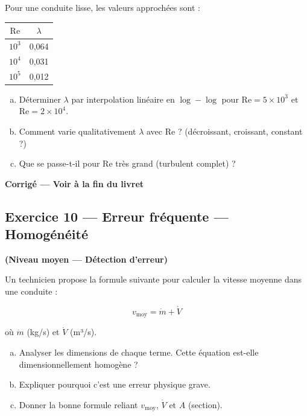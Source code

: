 Pour une conduite lisse, les valeurs approchées sont :

\begin{center}
  \sffamily\small
  \begin{tabular}{|c|c|}
    \hline
    $\mathrm{Re}$ & $\lambda$ \\
    \hline
    $10^3$ & 0{,}064 \\
    $10^4$ & 0{,}031 \\
    $10^5$ & 0{,}012 \\
    \hline
  \end{tabular}
\end{center}

\begin{enumerate}[a)]
  \item Déterminer $\lambda$ par interpolation linéaire en $\log-\log$ pour $\mathrm{Re} = 5 \times 10^3$ et
        $\mathrm{Re} = 2 \times 10^4$.

  \item Comment varie qualitativement $\lambda$ avec $\mathrm{Re}$ ? (décroissant, croissant, constant ?)

  \item Que se passe-t-il pour $\mathrm{Re}$ très grand (turbulent complet) ?
\end{enumerate}

\textbf{Corrigé — Voir à la fin du livret}

\subsection*{Exercice 10 — Erreur fréquente — Homogénéité}

\textbf{(Niveau moyen — Détection d'erreur)}

Un technicien propose la formule suivante pour calculer la vitesse moyenne dans une conduite :

\[
  v_{\text{moy}} = \dot{m} + \dot{V}
\]

où $\dot{m}$ (kg/s) et $\dot{V}$ (m³/s).

\begin{enumerate}[a)]
  \item Analyser les dimensions de chaque terme. Cette équation est-elle dimensionnellement homogène ?

  \item Expliquer pourquoi c'est une erreur physique grave.

  \item Donner la bonne formule reliant $v_{\text{moy}}$, $\dot{V}$ et $A$ (section).
\end{enumerate}

